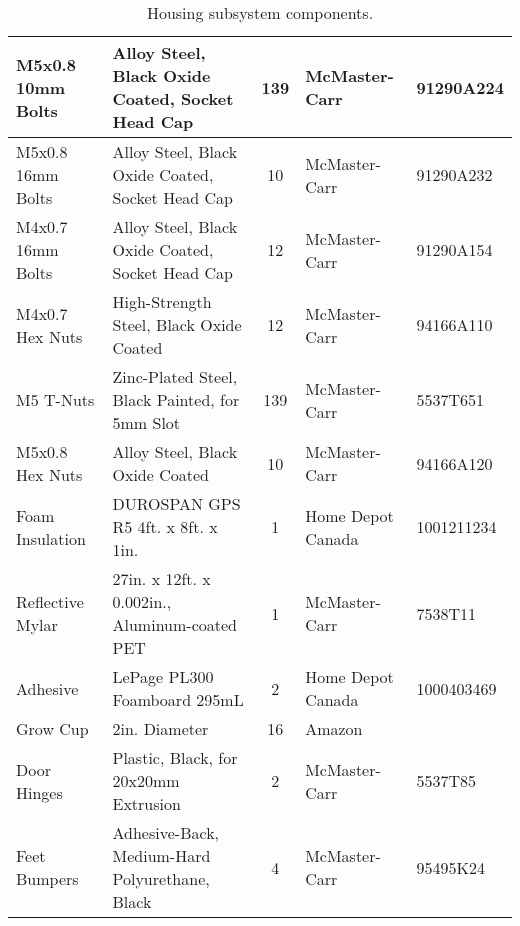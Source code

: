 \begin{table}[!ht]
\begin{tabular}{|l|l|c|l|l|}
        M5x0.8 10mm Bolts       & Alloy Steel, Black Oxide Coated, Socket Head Cap      & 139       & McMaster-Carr     & 91290A224             \\ \hline
        M5x0.8 16mm Bolts       & Alloy Steel, Black Oxide Coated, Socket Head Cap      & 10        & McMaster-Carr     & 91290A232             \\ \hline
        M4x0.7 16mm Bolts       & Alloy Steel, Black Oxide Coated, Socket Head Cap      & 12        & McMaster-Carr     & 91290A154             \\ \hline
        M4x0.7 Hex Nuts         & High-Strength Steel, Black Oxide Coated               & 12        & McMaster-Carr     & 94166A110             \\ \hline
        M5 T-Nuts               & Zinc-Plated Steel, Black Painted, for 5mm Slot        & 139       & McMaster-Carr     & 5537T651              \\ \hline
        M5x0.8 Hex Nuts         & Alloy Steel, Black Oxide Coated                       & 10        & McMaster-Carr     & 94166A120             \\ \hline
        Foam Insulation         & DUROSPAN GPS R5 4ft. x 8ft. x 1in.                    & 1         & Home Depot Canada & 1001211234            \\ \hline
        Reflective Mylar        & 27in. x 12ft. x 0.002in., Aluminum-coated PET         & 1         & McMaster-Carr     & 7538T11               \\ \hline
        Adhesive                & LePage PL300 Foamboard 295mL                          & 2         & Home Depot Canada & 1000403469            \\ \hline
        Grow Cup                & 2in. Diameter                                         & 16        & Amazon            & ~                     \\ \hline
        Door Hinges             & Plastic, Black, for 20x20mm Extrusion                 & 2         & McMaster-Carr     & 5537T85               \\ \hline
        Feet Bumpers            & Adhesive-Back, Medium-Hard Polyurethane, Black        & 4         & McMaster-Carr     & 95495K24              \\ \hline
    \end{tabular}
    \caption{Housing subsystem components.}
    \label{tab:housing_parts}
\end{table}

